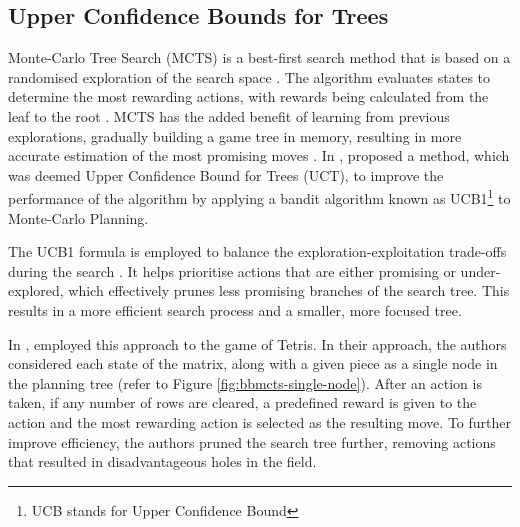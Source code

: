\documentclass[a4paper, 12pt]{extreport}
\begin{document}
	\subsection{Upper Confidence Bounds for Trees}
	Monte-Carlo Tree Search (MCTS) is a best-first search method that is based on a randomised exploration of the search space \cite{mcts}. The algorithm evaluates states to determine the most rewarding actions, with rewards being calculated from the leaf to the root \cite{tetris-bb-mc-planning}. MCTS has the added benefit of learning from previous explorations, gradually building a game tree in memory, resulting in more accurate estimation of the most promising moves \cite{mcts}. In \citeyear{bandit-based-mcts}, \citeauthor{bandit-based-mcts} \cite{bandit-based-mcts} proposed a method, which was deemed Upper Confidence Bound for Trees (UCT), to improve the performance of the algorithm by applying a bandit algorithm known as UCB1\footnote{UCB stands for Upper Confidence Bound} to Monte-Carlo Planning. 
	
	The UCB1 formula is employed to balance the exploration-exploitation trade-offs during the search \cite{tetris-bb-mc-planning}. It helps prioritise actions that are either promising or under-explored, which effectively prunes less promising branches of the search tree. This results in a more efficient search process and a smaller, more focused tree.
	
	In \citeyear{tetris-bb-mc-planning}, \citeauthor{tetris-bb-mc-planning} \cite{tetris-bb-mc-planning} employed this approach to the game of Tetris. In their approach, the authors considered each state of the matrix, along with a given piece as a single node in the planning tree (refer to Figure \ref{fig:bbmcts-single-node}). After an action is taken, if any number of rows are cleared, a predefined reward is given to the action and the most rewarding action is selected as the resulting move. To further improve efficiency, the authors pruned the search tree further, removing actions that resulted in disadvantageous holes in the field.
	
\end{document}
